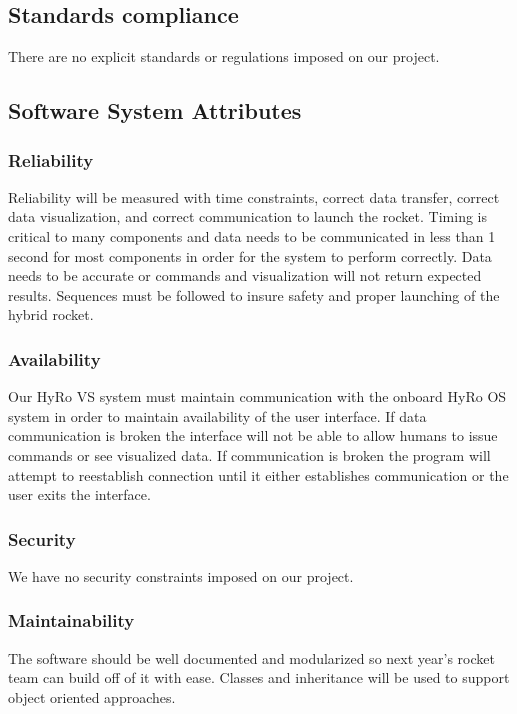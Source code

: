\documentclass[10pt,draftclsnofoot,onecolumn,compsoc]{IEEEtran}
\begin{document}
\subsection{Standards compliance}
There are no explicit standards or regulations imposed on our project.

\subsection{Software System Attributes}
\subsubsection{Reliability} Reliability will be measured with time constraints, correct data transfer, correct data visualization, and correct communication to launch the rocket. Timing is critical to many components and data needs to be communicated in less than 1 second for most components in order for the system to perform correctly. Data needs to be accurate or commands and visualization will not return expected results. Sequences must be followed to insure safety and proper launching of the hybrid rocket.

\subsubsection{Availability}
Our HyRo VS system must maintain communication with the onboard HyRo OS system in order to maintain availability of the user interface. If data communication is broken the interface will not be able to allow humans to issue commands or see visualized data. If communication is broken the program will attempt to reestablish connection until it either establishes communication or the user exits the interface.

\subsubsection{Security}
We have no security constraints imposed on our project.
\subsubsection{Maintainability} The software should be well documented and modularized so next year's rocket team can build off of it with ease. Classes and inheritance will be used to support object oriented approaches.
\end{document}
